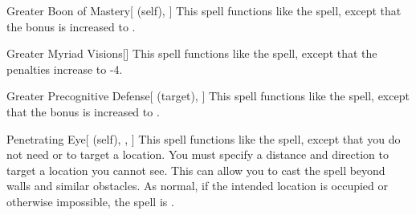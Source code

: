 \lowercase{\hypertarget{spell:Greater Boon of Mastery}{}}\label{spell:Greater Boon of Mastery}
\begin{attuneability}[\nth{4}]{\hypertarget{spell:Greater Boon of Mastery}{Greater Boon of Mastery}}[ (self), ]
This spell functions like the  spell, except that the bonus is increased to .
\end{attuneability}
\vspace{0.25em}



\lowercase{\hypertarget{spell:Greater Myriad Visions}{}}\label{spell:Greater Myriad Visions}
\begin{freeability}[\nth{4}]{\hypertarget{spell:Greater Myriad Visions}{Greater Myriad Visions}}[]
This spell functions like the  spell, except that the penalties increase to -4.
\end{freeability}
\vspace{0.25em}



\lowercase{\hypertarget{spell:Greater Precognitive Defense}{}}\label{spell:Greater Precognitive Defense}
\begin{attuneability}[\nth{4}]{\hypertarget{spell:Greater Precognitive Defense}{Greater Precognitive Defense}}[ (target), ]
This spell functions like the  spell, except that the bonus is increased to .
\end{attuneability}
\vspace{0.25em}



\lowercase{\hypertarget{spell:Penetrating Eye}{}}\label{spell:Penetrating Eye}
\begin{attuneability}[\nth{4}]{\hypertarget{spell:Penetrating Eye}{Penetrating Eye}}[ (self), , ]
This spell functions like the  spell, except that you do not need  or  to target a location.
You must specify a distance and direction to target a location you cannot see.
This can allow you to cast the spell beyond walls and similar obstacles.
As normal, if the intended location is occupied or otherwise impossible, the spell is .
\end{attuneability}
\vspace{0.25em}



